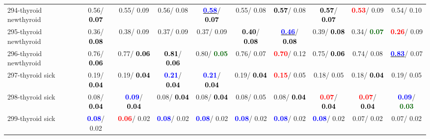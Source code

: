 \begin{table}[h]
\begin{center}
{\begin{tabular}{lc|c|c|c|c|c|c|c|c}
294-thyroid newthyroid &   0.56/\textcolor{black}{\textbf{  0.07}} &   0.55/  0.09 &   0.56/  0.08 & \underline{\textcolor{blue}{\textbf{  0.58}}}/\textcolor{black}{\textbf{  0.07}} &   0.55/  0.08 & \textcolor{black}{\textbf{  0.57}}/  0.08 & \textcolor{black}{\textbf{  0.57}}/\textcolor{black}{\textbf{  0.07}} & \textcolor{red}{\textbf{  0.53}}/  0.09 &   0.54/  0.10 \\
295-thyroid newthyroid &   0.36/\textcolor{black}{\textbf{  0.08}} &   0.38/  0.09 &   0.37/  0.09 &   0.37/  0.09 & \textcolor{black}{\textbf{  0.40}}/\textcolor{black}{\textbf{  0.08}} & \underline{\textcolor{blue}{\textbf{  0.46}}}/\textcolor{black}{\textbf{  0.08}} &   0.39/\textcolor{black}{\textbf{  0.08}} &   0.34/\textcolor{darkgreen}{\textbf{  0.07}} & \textcolor{red}{\textbf{  0.26}}/  0.09 \\ \hline
296-thyroid newthyroid &   0.76/\textcolor{black}{\textbf{  0.06}} &   0.77/\textcolor{black}{\textbf{  0.06}} & \textcolor{black}{\textbf{  0.81}}/\textcolor{black}{\textbf{  0.06}} &   0.80/\textcolor{darkgreen}{\textbf{  0.05}} &   0.76/  0.07 & \textcolor{red}{\textbf{  0.70}}/  0.12 &   0.75/\textcolor{black}{\textbf{  0.06}} &   0.74/  0.08 & \underline{\textcolor{blue}{\textbf{  0.83}}}/  0.07 \\
297-thyroid sick &   0.19/\textcolor{black}{\textbf{  0.04}} &   0.19/\textcolor{black}{\textbf{  0.04}} & \textcolor{blue}{\textbf{  0.21}}/\textcolor{black}{\textbf{  0.04}} & \textcolor{blue}{\textbf{  0.21}}/\textcolor{black}{\textbf{  0.04}} &   0.19/\textcolor{black}{\textbf{  0.04}} & \textcolor{red}{\textbf{  0.15}}/  0.05 &   0.18/  0.05 &   0.18/\textcolor{black}{\textbf{  0.04}} &   0.19/  0.05 \\
298-thyroid sick &   0.08/\textcolor{black}{\textbf{  0.04}} & \textcolor{blue}{\textbf{  0.09}}/\textcolor{black}{\textbf{  0.04}} &   0.08/\textcolor{black}{\textbf{  0.04}} &   0.08/\textcolor{black}{\textbf{  0.04}} &   0.08/  0.05 &   0.08/\textcolor{black}{\textbf{  0.04}} & \textcolor{red}{\textbf{  0.07}}/\textcolor{black}{\textbf{  0.04}} & \textcolor{red}{\textbf{  0.07}}/\textcolor{black}{\textbf{  0.04}} & \textcolor{blue}{\textbf{  0.09}}/\textcolor{darkgreen}{\textbf{  0.03}} \\
299-thyroid sick & \textcolor{blue}{\textbf{  0.08}}/  0.02 & \textcolor{red}{\textbf{  0.06}}/  0.02 & \textcolor{blue}{\textbf{  0.08}}/  0.02 & \textcolor{blue}{\textbf{  0.08}}/  0.02 & \textcolor{blue}{\textbf{  0.08}}/  0.02 & \textcolor{blue}{\textbf{  0.08}}/  0.02 & \textcolor{blue}{\textbf{  0.08}}/  0.02 &   0.07/  0.02 &   0.07/  0.02 \\

\end{tabular}}
\end{center}
\end{table}
